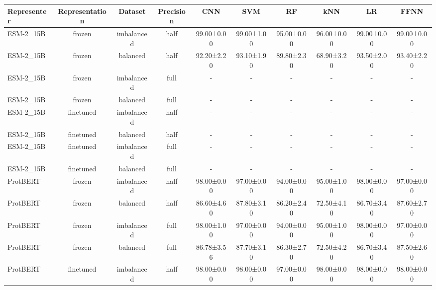 \begin{tabular}{lccccccccc}
\toprule
 \textbf{Representer} & \textbf{Representation} &    \textbf{Dataset} & \textbf{Precision} &         \textbf{CNN} &         \textbf{SVM} &          \textbf{RF} &         \textbf{kNN} &          \textbf{LR} &        \textbf{FFNN} \\
\midrule
   ESM-2\_15B &         frozen & imbalanced &      half &  99.00±0.00 &  99.00±1.00 &  95.00±0.00 &  96.00±0.00 &  99.00±0.00 &  99.00±0.00 \\
   ESM-2\_15B &         frozen &   balanced &      half &  92.20±2.20 &  93.10±1.90 &  89.80±2.30 &  68.90±3.20 &  93.50±2.00 &  93.40±2.20 \\
   ESM-2\_15B &         frozen & imbalanced &      full &           - &           - &           - &           - &           - &           - \\
   ESM-2\_15B &         frozen &   balanced &      full &           - &           - &           - &           - &           - &           - \\
   ESM-2\_15B &      finetuned & imbalanced &      half &           - &           - &           - &           - &           - &           - \\
   ESM-2\_15B &      finetuned &   balanced &      half &           - &           - &           - &           - &           - &           - \\
   ESM-2\_15B &      finetuned & imbalanced &      full &           - &           - &           - &           - &           - &           - \\
   ESM-2\_15B &      finetuned &   balanced &      full &           - &           - &           - &           - &           - &           - \\
    ProtBERT &         frozen & imbalanced &      half &  98.00±0.00 &  97.00±0.00 &  94.00±0.00 &  95.00±1.00 &  98.00±0.00 &  97.00±0.00 \\
    ProtBERT &         frozen &   balanced &      half &  86.60±4.60 &  87.80±3.10 &  86.20±2.40 &  72.50±4.10 &  86.70±3.40 &  87.60±2.70 \\
    ProtBERT &         frozen & imbalanced &      full &  98.00±1.00 &  97.00±0.00 &  94.00±0.00 &  95.00±1.00 &  98.00±0.00 &  97.00±0.00 \\
    ProtBERT &         frozen &   balanced &      full &  86.78±3.56 &  87.70±3.10 &  86.30±2.70 &  72.50±4.20 &  86.70±3.40 &  87.50±2.60 \\
    ProtBERT &      finetuned & imbalanced &      half &  98.00±0.00 &  98.00±0.00 &  97.00±0.00 &  98.00±0.00 &  98.00±0.00 &  98.00±0.00 \\

\end{tabular}
